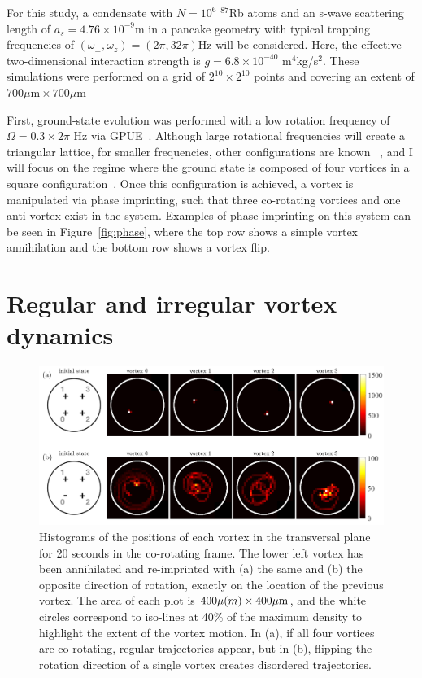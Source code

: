 For this study, a condensate with $N = 10^6$ $^{87}$Rb atoms and an s-wave scattering length of $a_s=4.76\times 10^{-9}$m in a pancake geometry with typical trapping frequencies of $(\omega_\perp, \omega_z) = (2\pi, 32\pi)$Hz will be considered.
Here, the effective two-dimensional interaction strength is $g = 6.8\times 10^{-40}$ m$^4$kg/s$^2$.
These simulations were performed on a grid of $2^{10} \times 2^{10}$ points and covering an extent of $700\mu \text{m} \times 700 \mu \text{m}$

First, ground-state evolution was performed with a low rotation frequency of $\Omega = 0.3 \times 2\pi$ Hz via GPUE~\cite{schloss2018}.
Although large rotational frequencies will create a triangular lattice, for smaller frequencies, other configurations are known ~\cite{aftalion2001}, and I will focus on the regime where the ground state is composed of four vortices in a square configuration~\cite{zampetaki2013}.
Once this configuration is achieved, a vortex is manipulated via phase imprinting, such that three co-rotating vortices and one anti-vortex exist in the system.
Examples of phase imprinting on this system can be seen in Figure~\ref{fig:phase}, where the top row shows a simple vortex annihilation and the bottom row shows a vortex flip.

\section{Regular and irregular vortex dynamics}

\begin{figure}
\includegraphics[width=\textwidth]{data/2d/histogram/histogram}

\caption{
Histograms of the positions of each vortex in the transversal plane for 20 seconds in the co-rotating frame.
The lower left vortex has been annihilated and re-imprinted with (a) the same and (b) the opposite direction of rotation, exactly on the location of the previous vortex.
The area of each plot is $400\mu \text(m) \times 400 \mu \text{m}$, and the white circles correspond to iso-lines at 40\% of the maximum density to highlight the extent of the vortex motion.
In (a), if all four vortices are co-rotating, regular trajectories appear, but in (b), flipping the rotation direction of a single vortex creates disordered trajectories.
}
\label{fig:histogram}
\end{figure}

